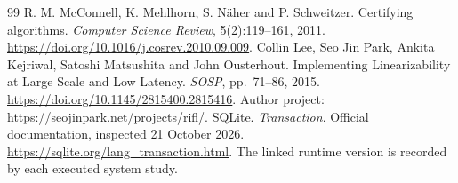 \documentclass[11pt,letterpaper]{article}
\theoremstyle{definition}\newtheorem{definition}[theorem]{Definition}
\theoremstyle{remark}\newtheorem{remark}[theorem]{Remark}
\begin{document}
\begin{thebibliography}{99}
R. M. McConnell, K. Mehlhorn, S. Näher and P. Schweitzer. Certifying algorithms. \emph{Computer Science Review}, 5(2):119--161, 2011. \url{https://doi.org/10.1016/j.cosrev.2010.09.009}.
Collin Lee, Seo Jin Park, Ankita Kejriwal, Satoshi Matsushita and John Ousterhout. Implementing Linearizability at Large Scale and Low Latency. \emph{SOSP}, pp.~71--86, 2015. \url{https://doi.org/10.1145/2815400.2815416}. Author project: \url{https://seojinpark.net/projects/rifl/}.
SQLite. \emph{Transaction}. Official documentation, inspected 21 October 2026. \url{https://sqlite.org/lang_transaction.html}. The linked runtime version is recorded by each executed system study.
\end{thebibliography}
\end{document}
